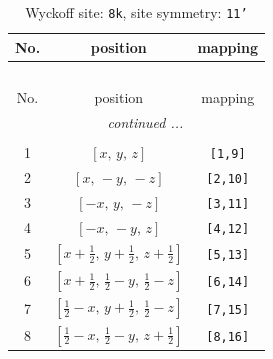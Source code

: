 \documentclass[fleqn,8pt]{jsarticle}
\begin{document}
\renewcommand{\arraystretch}{1.2}
\begin{longtable}{ccc}
\caption{Wyckoff site: {\tt 8k}, site symmetry: {\tt 11'}}
 \\
 \hline \hline
No. & position & mapping \\ \hline \endfirsthead

\multicolumn{2}{l}{\tablename\ \thetable{}} \\
 \hline \hline
No. & position & mapping \\ \hline \endhead

 \hline \hline
\multicolumn{2}{r}{\footnotesize\it continued ...} \\ \endfoot

 \hline \hline
\multicolumn{2}{r}{} \\ \endlastfoot

1 & $\left[ x,\, y,\, z \right]$ & {\tt [1,9]} \\ \hline
2 & $\left[ x,\, - y,\, - z \right]$ & {\tt [2,10]} \\ \hline
3 & $\left[ - x,\, y,\, - z \right]$ & {\tt [3,11]} \\ \hline
4 & $\left[ - x,\, - y,\, z \right]$ & {\tt [4,12]} \\ \hline
5 & $\left[ x + \frac{1}{2},\, y + \frac{1}{2},\, z + \frac{1}{2} \right]$ & {\tt [5,13]} \\ \hline
6 & $\left[ x + \frac{1}{2},\, \frac{1}{2} - y,\, \frac{1}{2} - z \right]$ & {\tt [6,14]} \\ \hline
7 & $\left[ \frac{1}{2} - x,\, y + \frac{1}{2},\, \frac{1}{2} - z \right]$ & {\tt [7,15]} \\ \hline
8 & $\left[ \frac{1}{2} - x,\, \frac{1}{2} - y,\, z + \frac{1}{2} \right]$ & {\tt [8,16]} \\
\end{longtable}
\end{document}
